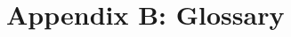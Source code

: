 \documentclass[../mthe-493-project-proposal.tex]{subfiles}
\begin{document}
    \chapter{Appendix B: Glossary}
    \label{ap:glossary}

    
\end{document}
